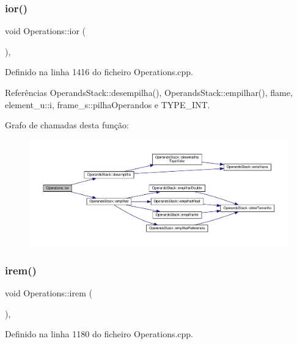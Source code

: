 \subsubsection{\texorpdfstring{ior()}{ior()}}
{\footnotesize\ttfamily void Operations\+::ior (\begin{DoxyParamCaption}{ }\end{DoxyParamCaption})\hspace{0.3cm}{\ttfamily [static]}, {\ttfamily [private]}}



Definido na linha 1416 do ficheiro Operations.\+cpp.



Referências Operands\+Stack\+::desempilha(), Operands\+Stack\+::empilhar(), flame, element\+\_\+u\+::i, frame\+\_\+s\+::pilha\+Operandos e T\+Y\+P\+E\+\_\+\+I\+NT.

Grafo de chamadas desta função\+:
\nopagebreak
\begin{figure}[H]
\begin{center}
\leavevmode
\includegraphics[width=350pt]{classOperations_aaa890c310bc7a93e97b2c5004df94e70_cgraph}
\end{center}
\end{figure}
\mbox{\label{classOperations_a510bd2d155695861597a4413b44565bc}} 
\subsubsection{\texorpdfstring{irem()}{irem()}}
{\footnotesize\ttfamily void Operations\+::irem (\begin{DoxyParamCaption}{ }\end{DoxyParamCaption})\hspace{0.3cm}{\ttfamily [static]}, {\ttfamily [private]}}



Definido na linha 1180 do ficheiro Operations.\+cpp.



